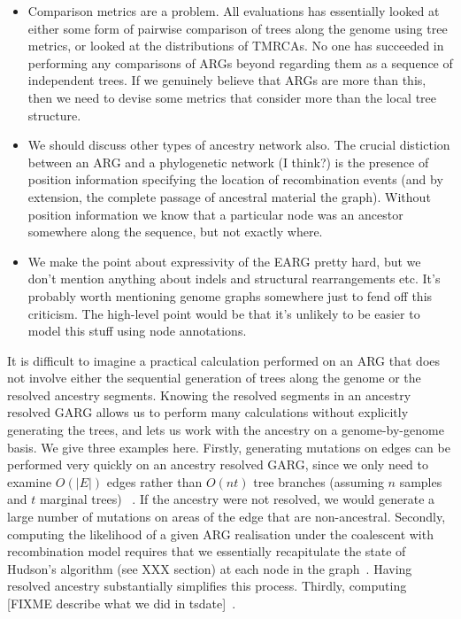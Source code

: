 \documentclass{article}
\begin{document}
\begin{itemize}
\item Comparison metrics are a problem. All evaluations has essentially
looked at either some form of pairwise comparison of trees along the genome
using tree metrics, or looked at the distributions of TMRCAs. No
one has succeeded in performing any comparisons of ARGs beyond
regarding them as a sequence of independent trees. If we genuinely believe
that ARGs are more than this, then we need to devise some metrics that
consider more than the local tree structure.

\item We should discuss other types of ancestry network also.
The crucial distiction between an ARG and a phylogenetic network (I think?) is
the presence of position information specifying the location of
recombination events (and by extension, the complete passage
of ancestral material the graph). Without position information
we know that a particular node was an ancestor somewhere along the
sequence, but not exactly where.

\item We make the point about expressivity of the EARG pretty
hard, but we don't mention anything about indels and structural
rearrangements etc. It's probably worth mentioning genome graphs
somewhere just to fend off this criticism. The high-level point
would be that it's unlikely to be easier to model this stuff
using node annotations.

\end{itemize}

It is difficult to imagine a practical calculation performed on an
ARG that does not involve either the sequential generation of trees
along the genome or the resolved ancestry segments.
Knowing the resolved segments in an ancestry resolved GARG allows
us to perform many calculations without explicitly generating
the trees, and lets us work with the ancestry on a genome-by-genome
basis. We give three examples here. Firstly, generating mutations
on edges can be performed very quickly on an ancestry resolved
GARG, since we only need to examine $O(|E|)$ edges rather than
$O(nt)$ tree branches (assuming $n$ samples and $t$ marginal trees)
~\citep{baumdicker2021efficient}. If the ancestry were not resolved,
we would generate a large number of mutations on areas of the edge that
are non-ancestral. Secondly, computing the likelihood of a given
ARG realisation under the coalescent with recombination model
requires that we essentially recapitulate the state of Hudson's
algorithm (see XXX section) at each node in
the graph~\citep{baumdicker2021efficient}. Having resolved ancestry
substantially simplifies this process. Thirdly, computing
[FIXME describe what we did in tsdate]~\citep{wohns2022unified}.
\end{document}
